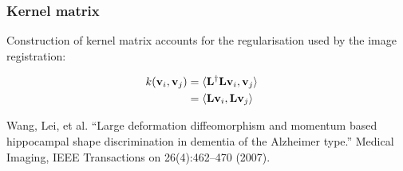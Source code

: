 \begin{frame}
\frametitle{Kernel matrix}
Construction of kernel matrix accounts for the regularisation used by the image registration:
\begin{Large}
\begin{align*}
k({\bf v}_i,{\bf v}_j) & = \langle {\bf L}^{\dagger} {\bf L} {\bf v}_i, {\bf v}_j \rangle\cr
                   & = \langle {\bf L} {\bf v}_i, {\bf L} {\bf v}_j \rangle
\end{align*}
\end{Large}

\vspace{0.25cm}
\begin{tiny}
Wang, Lei, et al. ``Large deformation diffeomorphism and momentum based hippocampal shape discrimination in dementia of the Alzheimer type.'' Medical Imaging, IEEE Transactions on 26(4):462--470 (2007).\par
\end{tiny}
\end{frame}




